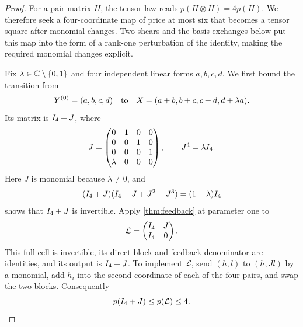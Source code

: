 \begin{proof}
For a pair matrix $H$, the tensor law reads
$p(H\otimes H)=4p(H)$. We therefore seek a four-coordinate map
of price at most six that becomes a tensor square after monomial
changes. Two shears and the basis exchanges below put this map into
the form of a rank-one perturbation of the identity, making the
required monomial changes explicit.

Fix $\lambda\in\mathbb C\setminus\{0,1\}$ and four independent linear
forms $a,b,c,d$. We first bound the transition from
\[
 Y^{(0)}=(a,b,c,d)\quad\hbox{to}\quad
 X=(a+b,b+c,c+d,d+\lambda a).
\]
Its matrix is $I_4+J$, where
\[
 J=\begin{pmatrix}
 0&1&0&0\\0&0&1&0\\0&0&0&1\\\lambda&0&0&0
 \end{pmatrix},\qquad J^4=\lambda I_4.
\]
Here $J$ is monomial because $\lambda\ne0$, and
\[
 (I_4+J)(I_4-J+J^2-J^3)=(1-\lambda)I_4
\]
shows that $I_4+J$ is invertible. Apply
\cref{thm:feedback} at parameter one to
\[
 \mathcal L=\begin{pmatrix}I_4&J\\I_4&0\end{pmatrix}.
\]
This full cell is invertible, its direct block and feedback
denominator are identities, and its output is $I_4+J$.
To implement $\mathcal L$, send $(h,l)$ to $(h,Jl)$ by a monomial,
add $h_i$ into the second coordinate of each of the four pairs,
and swap the two blocks. Consequently
\begin{equation}\label{pivot:eq:four-start}
 p(I_4+J)\le p(\mathcal L)\le4.
\end{equation}


\end{proof}
